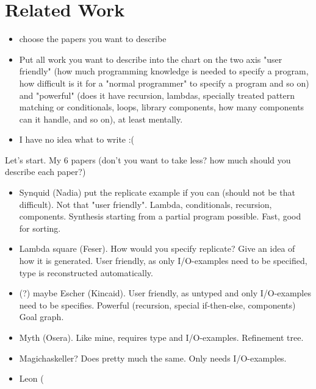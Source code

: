 \chapter{Related Work} \label{relatedwork}


\begin{itemize}
\item choose the papers you want to describe
\item Put all work you want to describe into the chart on the two axis "user friendly" (how much programming knowledge is needed to specify a program, how difficult is it for a "normal programmer" to specify a program and so on) and "powerful" (does it have recursion, lambdas, specially treated pattern matching or conditionals, loops, library components, how many components can it handle, and so on), at least mentally.
\item I have no idea what to write :(
\end{itemize}


Let's start. My 6 papers (don't you want to take less? how much should you describe each paper?)
\begin{itemize}
\item Synquid (Nadia) put the replicate example if you can (should not be that difficult). Not that "user friendly". Lambda, conditionals, recursion, components. Synthesis starting from a partial program possible. Fast, good for sorting.
\item Lambda square (Feser). How would you specify replicate? Give an idea of how it is generated. User friendly, as only I/O-examples need to be specified, type is reconstructed automatically.
\item (?) maybe Escher (Kincaid). User friendly, as untyped and only I/O-examples need to be specifies. Powerful (recursion, special if-then-else, components) Goal graph.
\item Myth (Osera). Like mine, requires type and I/O-examples. Refinement tree.
\item Magichaskeller? Does pretty much the same. Only needs I/O-examples.
\item Leon (
\end{itemize}


